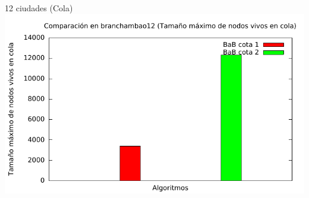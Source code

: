 \begin{frame}{12 ciudades (Cola)}
\includegraphics[width=\textwidth]{img/barras_branchambao12_cola}
\end{frame}
